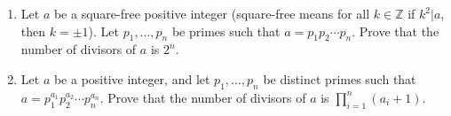 \documentclass[letterpaper,12pt]{article}
\def\Z{\mathbb Z}
\begin{document}
\begin{enumerate}
\item
Let $a$ be a square-free positive integer (square-free means for all $k\in \Z$ if $k^2|a$, then $k=\pm 1$). Let $p_1,\dots,p_n$ be primes such that $a=p_1p_2\cdots p_n$. Prove that the number of divisors of $a$ is $2^n$.

\item
Let $a$ be a positive integer, and let $p_1,\dots,p_n$ be distinct primes such that $a=p_1^{a_1}p_2^{a_2}\cdots p_n^{a_n}$. Prove that the number of divisors of $a$ is $\prod_{i=1}^n(a_i+1)$.

\end{enumerate}
\end{document}
